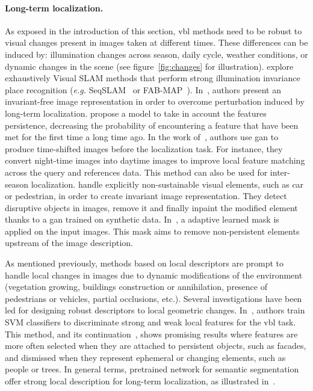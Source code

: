 		\paragraph{Long-term localization.}
	       	\label{para:illum}
			As exposed in the introduction of this section, \ac{vbl} methods need to be robust to visual changes present in images taken at different times. These differences can be induced by: illumination changes across season, daily cycle, weather conditions, or dynamic changes in the scene (see figure~\ref{fig:changes} for illustration). \citet[Section VII]{Lowry2016} explore exhaustively Visual SLAM methods that perform strong illumination invariance place recognition (\textit{e.g.} SeqSLAM~\citep{Milford2012,Pepperell2014,Pepperell2016} or FAB-MAP~\citep{Cummins2008,Cummins2010,Paul2010}). In~\citep{Lowry2016a}, authors present an invariant-free image representation in order to overcome perturbation induced by long-term localization. \citet{Rosen2016} propose a model to take in account the features persistence, decreasing the probability of encountering a feature that have been met for the first time a long time ago. In the work of~\citet{Porav2018}, authors use \ac{gan} to produce time-shifted images before the localization task. For instance, they convert night-time images into daytime images to improve local feature matching across the query and references data. This method can also be used for inter-season localization. \citet{Bescos2019} handle explicitly non-sustainable visual elements, such as car or pedestrian, in order to create invariant image representation. They detect disruptive objects in images, remove it and finally inpaint the modified element thanks to a \ac{gan} trained on synthetic data. In~\citep{Naseer2017a}, a adaptive learned mask is applied on the input images. This mask aims to remove non-persistent elements upstream of the image description.
			
			As mentioned previously, methods based on local descriptors are prompt to handle local changes in images due to dynamic modifications of the environment (\eg vegetation growing, buildings construction or annihilation, presence of pedestrians or vehicles, partial occlusions, etc.). Several investigations have been led for designing robust descriptors to local geometric changes. In~\citep{Kim2015,Linegar2016}, authors train SVM classifiers to discriminate strong and weak local features for the \ac{vbl} task. This method, and its continuation~\citep{Kim2017}, shows promising results where features are more often selected when they are attached to persistent objects, such as facades, and dismissed when they represent ephemeral or changing elements, such as people or trees. In general terms, pretrained network for semantic segmentation offer strong local description for long-term localization, as illustrated in~\citep{Mousavian2015,Garg2018a,Toft2018,Shi2019,Schonberger2017a}.
			
